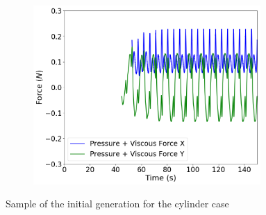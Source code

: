 \begin{figure}[h!]
\begin{subfigure}[t]{0.31\textwidth}
        \includegraphics[width=0.95\textwidth, height=0.18\textheight]{Figures/4/OSCg0i45.png}
    \end{subfigure}
    \caption{Sample of the initial generation for the cylinder case}
    \label{fig:initialCyl}
\end{figure}

